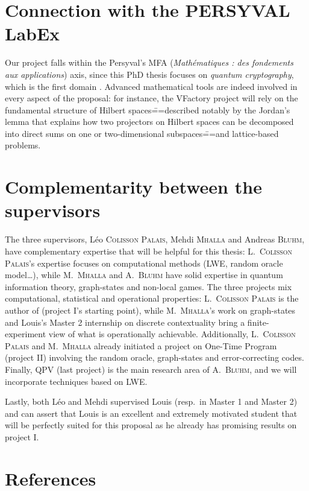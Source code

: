 \section{Connection with the PERSYVAL LabEx}

Our project falls within the Persyval's MFA (\emph{Mathématiques : des fondements aux applications}) axis, since this PhD thesis focuses on \emph{quantum cryptography}, which is the first domain . Advanced mathematical tools are indeed involved in every aspect of the proposal: for instance, the VFactory project will rely on the fundamental structure of Hilbert spaces\===described notably by the Jordan's lemma that explains how two projectors on Hilbert spaces can be decomposed into direct sums on one or two-dimensional subspaces\===and lattice-based problems.

\section{Complementarity between the supervisors}

The three supervisors, Léo \textsc{Colisson Palais}, Mehdi \textsc{Mhalla} and Andreas \textsc{Bluhm}, have complementary expertise that will be helpful for this thesis: L.~\textsc{Colisson Palais}'s expertise focuses on computational methods (LWE, random oracle model…), while M.\ \textsc{Mhalla} and A.\ \textsc{Bluhm} have solid expertise in quantum information theory, graph-states and non-local games. The three projects mix computational, statistical and operational properties: L.\ \textsc{Colisson Palais} is the author of \cite{CCKW19_QFactoryClassicallyInstructedRemote} (project I's starting point), while M.\ \textsc{Mhalla}'s work on graph-states and Louis's Master 2 internship on discrete contextuality bring a finite-experiment view of what is operationally achievable. Additionally, L.\ \textsc{Colisson Palais} and M.\ \textsc{Mhalla} already initiated a project on One-Time Program (project II) involving the random oracle, graph-states and error-correcting codes. Finally, QPV (last project) is the main research area of A.\ \textsc{Bluhm}, and we will incorporate techniques based on LWE.

Lastly, both Léo and Mehdi supervised Louis (resp.\ in Master 1 and Master 2) and can assert that Louis is an excellent and extremely motivated student that will be perfectly suited for this proposal as he already has promising results on project I.

\section{References}
\printbibliography[heading=none]



